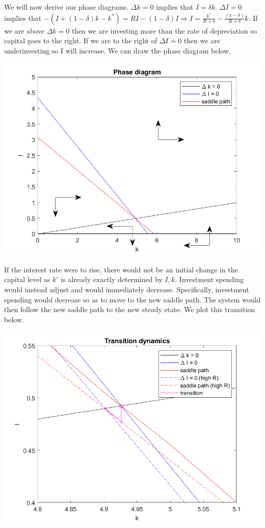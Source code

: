 \documentclass[11pt]{article} %
\begin{document}
We will now derive our phase diagrams. $\Delta k = 0$ implies that $I = \delta k$. $\Delta I = 0$ implies that $-(I + (1-\delta)k - k^{*}) = RI - (1-\delta)I \Rightarrow I = \frac{k^{*}}{R+\delta} - \frac{(1-\delta)}{R+\delta}k$. If we are above $\Delta k = 0$ then we are investing more than the rate of depreciation so capital goes to the right. If we are to the right of $\Delta I=0$ then we are underinvesting so I will increase. We can draw the phase diagram below.

\includegraphics{phase3}

If the interest rate were to rise, there would not be an initial change in the capital level as $k'$ is already exactly determined by $I,k$. Investment spending would instead adjust and would immediately decrease. Specifically, investment spending would decrease so as to move to the new saddle path. The system would then follow the new saddle path to the new steady state. We plot this transition below.

\includegraphics{transition3}
\end{document}
